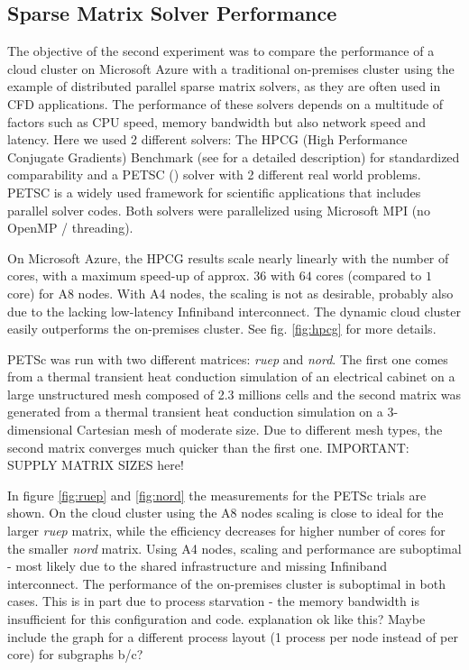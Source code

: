 \documentclass[3p,times]{elsarticle}
\begin{document}
\subsection{Sparse Matrix Solver Performance}
The objective of the second experiment was to compare the performance of a cloud cluster on Microsoft Azure with a traditional on-premises cluster using the example of distributed parallel sparse matrix solvers, as they are often used in CFD applications. The performance of these solvers depends on a multitude of factors such as CPU speed, memory bandwidth but also network speed and latency. Here we used 2 different solvers: The HPCG (High Performance Conjugate Gradients) Benchmark (see \cite{hpcg} for a detailed description) for standardized comparability and a PETSC (\cite{petsc}) solver with 2 different real world problems. PETSC is a widely used framework for scientific applications that includes parallel solver codes.
Both solvers were parallelized using Microsoft MPI (no OpenMP / threading).

On Microsoft Azure, the HPCG results scale nearly linearly with the number of cores, with a maximum speed-up of approx. $36$ with $64$ cores (compared to $1$ core) for A8 nodes. With A4 nodes, the scaling is not as desirable, probably also due to the lacking low-latency Infiniband interconnect. The dynamic cloud cluster easily outperforms the on-premises cluster. See fig. \ref{fig:hpcg} for more details.

PETSc was run with two different matrices: \textit{ruep} and \textit{nord}. The first one comes from a thermal transient heat conduction simulation of an electrical cabinet on a large unstructured mesh composed of 2.3 millions cells and the second matrix was generated from a thermal transient heat conduction simulation on a 3-dimensional Cartesian mesh of moderate size. Due to different mesh types, the second matrix converges much quicker than the first one.  \textcolor[rgb]{1,0,0}{IMPORTANT: SUPPLY MATRIX SIZES here!}

In figure \ref{fig:ruep} and \ref{fig:nord} the measurements for the PETSc trials are shown. On the cloud cluster using the A8 nodes scaling is close to ideal for the larger \textit{ruep} matrix, while the efficiency decreases for higher number of cores for the smaller \textit{nord} matrix. Using A4 nodes, scaling and performance are suboptimal - most likely due to the shared infrastructure and missing Infiniband interconnect.  The performance of the on-premises cluster is suboptimal in both cases. This is in part due to process starvation - the memory bandwidth is insufficient for this configuration and code. \textcolor[rgb]{1,0,0}{explanation ok like this? Maybe include the graph for a different process layout (1 process per node instead of per core) for subgraphs b/c? }
\end{document}
